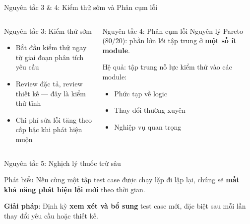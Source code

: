 \documentclass[aspectratio=169,12pt]{beamer}
\begin{document}
\begin{frame}{Nguyên tắc 3 \& 4: Kiểm thử sớm và Phân cụm lỗi}
  \begin{columns}
    \begin{block}{Nguyên tắc 3: Kiểm thử sớm}
      \begin{itemize}
        \item Bắt đầu kiểm thử ngay từ giai đoạn phân tích yêu cầu
        \item Review đặc tả, review thiết kế --- đây là kiểm thử tĩnh
        \item Chi phí sửa lỗi tăng theo cấp bậc khi phát hiện muộn
      \end{itemize}
    \end{block}

    \begin{block}{Nguyên tắc 4: Phân cụm lỗi}
      Nguyên lý Pareto (80/20): phần lớn lỗi tập trung ở
      \textbf{một số ít module}.

      \vspace{0.3em}
      Hệ quả: tập trung nỗ lực kiểm thử vào các module:
      \begin{itemize}
        \item Phức tạp về logic
        \item Thay đổi thường xuyên
        \item Nghiệp vụ quan trọng
      \end{itemize}
    \end{block}
  \end{columns}
\end{frame}

\begin{frame}[fragile]{Nguyên tắc 5: Nghịch lý thuốc trừ sâu}
  \begin{block}{Phát biểu}
    Nếu cùng một tập test case được chạy lặp đi lặp lại, chúng sẽ
    \textbf{mất khả năng phát hiện lỗi mới} theo thời gian.
  \end{block}

  \vspace{0.1em}
  \begin{center}
  \end{center}
  \vspace{-0.2em}

  \small\textbf{Giải pháp}: Định kỳ \textbf{xem xét và bổ sung} test case mới,
  đặc biệt sau mỗi lần thay đổi yêu cầu hoặc thiết kế.
\end{frame}
\end{document}
